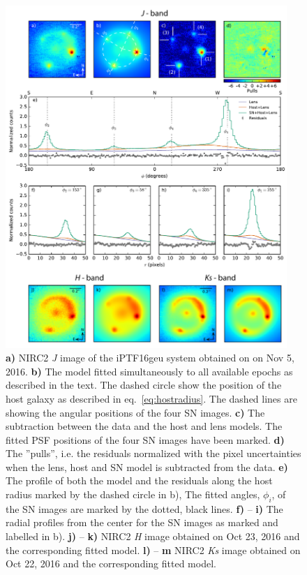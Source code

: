 \documentclass[a4paper,fleqn,usenatbib]{mnras}
\newcommand{\geu}{iPTF16geu\xspace}
\newcommand{\sn}{SN\xspace}
\newcommand{\jband}{{\it J}\xspace}
\newcommand{\hband}{{\it H}\xspace}
\newcommand{\ksband}{{\it Ks}\xspace}
\begin{document}
\begin{figure}
	\centering
	\includegraphics[width=0.95\textwidth]{forward_nirc2_v2.pdf}
	\caption{%
		{\bf a)} NIRC2 \jband image of the \geu system obtained on on Nov 5, 2016. 
		{\bf b)} The model fitted simultaneously to all available epochs as described in the text.  The dashed circle show the 
		position of the host galaxy as described in eq.~\eqref{eq:hostradius}.  The dashed lines are showing the angular 
		positions of the four \sn images. 
		{\bf c)} The subtraction between the data and the host and lens models.  The fitted PSF positions of the four \sn images 
		have been marked.  
		{\bf d)} The ''pulls'', i.e. the residuals normalized with the pixel uncertainties when the lens, host and \sn 
		model is subtracted from the data.  
		{\bf e)} The profile of both the model and the residuals along the host radius marked by the dashed circle in b), The 
		fitted angles, $\phi_i$, of the \sn images are marked by the dotted, black lines.
		{\bf f)} -- {\bf i)}  The radial profiles from the center for the \sn images as marked and labelled in b).
		{\bf j)} -- {\bf k)} NIRC2 \hband image obtained on Oct 23, 2016 and the corresponding fitted model.
		{\bf l)} -- {\bf m} NIRC2 \ksband image obtained on Oct 22, 2016 and the corresponding fitted model.
	\label{fig:nirc2}}
\end{figure}
\end{document}

